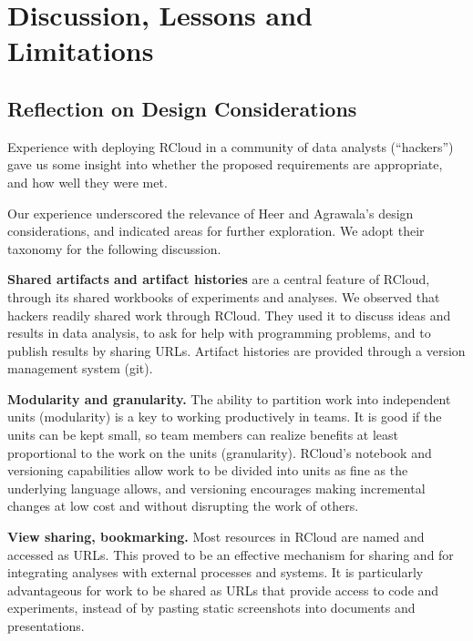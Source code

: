 \section{Discussion, Lessons and Limitations}
\label{sec:discussion}


\subsection{Reflection on Design Considerations}

Experience with deploying RCloud in a community of data analysts
(``hackers'') gave us some insight into whether the proposed
requirements are appropriate, and how well they were met.

Our experience underscored the relevance of Heer and Agrawala's design
considerations, and indicated areas for further exploration. We adopt
their taxonomy for the following discussion.

{\bf Shared artifacts and artifact histories} are a central feature
of RCloud, through its shared workbooks of experiments and analyses.
We observed that hackers readily shared work through RCloud. They
used it to discuss ideas and results in data analysis, to ask for help
with programming problems, and to publish results by sharing URLs.
Artifact histories are provided through a version management system (git).

{\bf Modularity and granularity.} The ability to partition work into
independent units (modularity) is a key to working productively in teams.
It is good if the units can be kept small, so team members can realize
benefits at least proportional to the work on the units (granularity).
RCloud's notebook and versioning capabilities allow work to be divided
into units as fine as the underlying language allows, and versioning
encourages making incremental changes at low cost and without disrupting
the work of others. 

{\bf View sharing, bookmarking.} Most resources in RCloud are named
and accessed as URLs. This proved to be an effective mechanism for
sharing and for integrating analyses with external processes and systems.
It is particularly advantageous for work to be shared as URLs that
provide access to code and experiments, instead of by pasting static
screenshots into documents and presentations.

